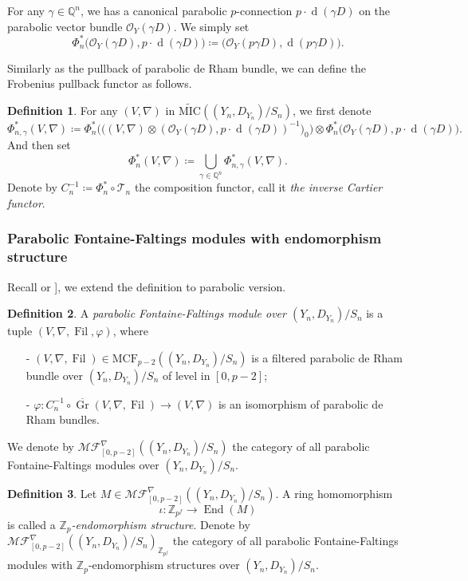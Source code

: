 \documentclass[12pt,twoside]{book}
\theoremstyle{plain}
\theoremstyle{definition}
\newtheorem{definition}[definition]{Definition}
\theoremstyle{remark}
\newcommand{\bQ}{{\mathbb Q}}
\newcommand{\bZ}{{\mathbb Z}}
\newcommand{\mO}{{\mathcal O}}
\newcommand{\mT}{{\mathcal T}}
\DeclareMathOperator\rmd{d}
\DeclareMathOperator\End{End}
\DeclareMathOperator\Fil{Fil}
\DeclareMathOperator\Gr{Gr}
\newcommand{\MF}{\mathcal{MF}}
\newcommand{\MCF}{\mathrm{MCF}}
\newcommand{\MIC}{\mathrm{MIC}}
\newcommand{\Zp}{{\mathbb{Z}_p}}
\numberwithin{equation}{section}
\begin{document}
For any $\gamma\in \bQ^n$, we has a canonical parabolic $p$-connection $p\cdot \rmd(\gamma D)$ on the parabolic vector bundle $\mO_Y(\gamma D)$. We simply set
\[\Phi^*_n\Big( \mO_Y(\gamma D),p\cdot \rmd(\gamma D)\Big) \coloneqq \Big( \mO_Y(p\gamma D),\rmd(p\gamma D)\Big).\]

Similarly as the pullback of parabolic de Rham bundle, we can define the Frobenius pullback functor as follows.
\begin{definition}
For any $(V,\nabla)$ in $\widetilde{\MIC}((Y_n,D_{Y_n})/S_n)$, we first denote
\[\Phi^*_{n,\gamma}(V,\nabla)
\coloneqq\Phi_n^*\Big(\big((V,\nabla) \otimes (\mO_Y(\gamma D),p\cdot \rmd(\gamma D))^{-1}\big)_0\Big)\otimes \Phi_n^*\big(\mO_Y(\gamma D),p\cdot \rmd(\gamma D)\big).\]
And then set
\[\Phi^*_n(V,\nabla)\coloneqq \bigcup_{\gamma\in\bQ^n} \Phi^*_{n,\gamma}(V,\nabla).\]
Denote by $C_n^{-1} \coloneqq \Phi_n^*\circ \mT_n$ the composition functor, call it \emph{the inverse Cartier functor}.
\end{definition}


\subsubsection{Parabolic Fontaine-Faltings modules with endomorphism structure}
Recall \cite[Lemma 1.1]{SYZ22} or \cite[Lemma 5.6]{LSZ19}], we extend the definition to parabolic version.
\begin{definition} A \emph{parabolic Fontaine-Faltings module over $(Y_n,D_{Y_n})/S_n$} is a tuple $(V,\nabla,\Fil,\varphi)$, where
\begin{itemize}
\item[-] $(V,\nabla,\Fil)\in \MCF_{p-2}((Y_n,D_{Y_n})/S_n)$ is a filtered parabolic de Rham bundle over $(Y_n,D_{Y_n})/S_n$ of level in $[0,p-2]$;
\item[-] $\varphi\colon C_n^{-1}\circ \overline{\Gr} (V,\nabla,\Fil)\rightarrow (V,\nabla)$ is an isomorphism of parabolic de Rham bundles.
\end{itemize}
We denote by \emph{$\MF_{[0,p-2]}^\nabla((Y_n,D_{Y_n})/S_n)$} the category of all parabolic Fontaine-Faltings modules over $(Y_n,D_{Y_n})/S_n$.
\end{definition}

\begin{definition}
Let $M\in \MF_{[0,p-2]}^\nabla((Y_n,D_{Y_n})/S_n)$. A ring homomorphism
\[\iota\colon \mathbb Z_{p^f}\rightarrow \End(M)\]
is called a \emph{$\Zp$-endomorphism structure}. Denote by \emph{$\MF_{[0,p-2]}^\nabla((Y_n,D_{Y_n})/S_n)_{\bZ_{p^f}}$} the category of all parabolic Fontaine-Faltings modules with $\Zp$-endomorphism structures over $(Y_n,D_{Y_n})/S_n$.
\end{definition}
\end{document}
